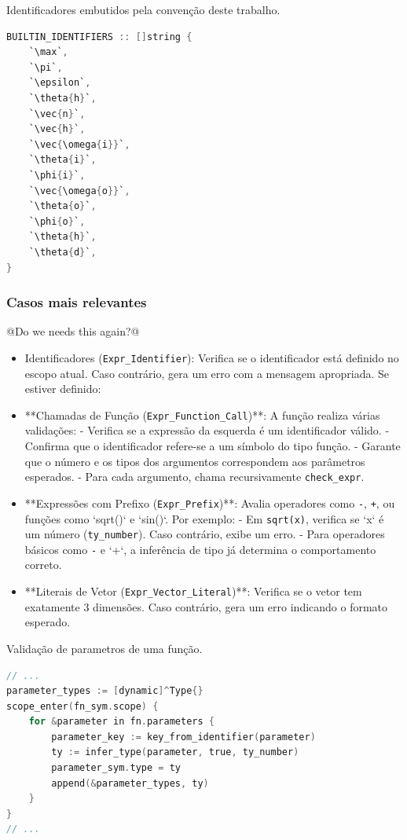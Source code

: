 \begin{codigo}[htb]
    \caption{\small Identificadores embutidos pela convenção deste trabalho. }
    \label{cod-builtins}
\begin{lstlisting}[language=C, numbers=none, frame=none, inputencoding=latin1]
BUILTIN_IDENTIFIERS :: []string {
    `\max`,
    `\pi`,
    `\epsilon`,
    `\theta{h}`,
    `\vec{n}`,
    `\vec{h}`,
    `\vec{\omega{i}}`,
    `\theta{i}`,
    `\phi{i}`,
    `\vec{\omega{o}}`,
    `\theta{o}`,
    `\phi{o}`,
    `\theta{h}`,
    `\theta{d}`,
}
\end{lstlisting}
\end{codigo}


\subsubsection{Casos mais relevantes}

@Do we needs this again?@
\begin{itemize}
    
    \item Identificadores (\verb`Expr_Identifier`):
      Verifica se o identificador está definido no escopo atual. Caso contrário, gera um erro com a mensagem apropriada. Se estiver definido:
    \item **Chamadas de Função (\verb`Expr_Function_Call`)**: 
      A função realiza várias validações:
      - Verifica se a expressão da esquerda é um identificador válido.
      - Confirma que o identificador refere-se a um símbolo do tipo função.
      - Garante que o número e os tipos dos argumentos correspondem aos parâmetros esperados.
      - Para cada argumento, chama recursivamente \verb`check_expr`.
    \item **Expressões com Prefixo (\verb`Expr_Prefix`)**:  
      Avalia operadores como \verb`-`, \verb`+`, ou funções como `sqrt()` e `sin()`. Por exemplo:
      - Em \verb`sqrt(x)`, verifica se `x` é um número (\verb`ty_number`). Caso contrário, exibe um erro.
      - Para operadores básicos como \verb`-` e `+`, a inferência de tipo já determina o comportamento correto.
    \item **Literais de Vetor (\verb`Expr_Vector_Literal`)**:  
      Verifica se o vetor tem exatamente 3 dimensões. Caso contrário, gera um erro indicando o formato esperado.
\end{itemize}





\begin{codigo}[htb]
    \caption{\small Validação de parametros de uma função. }
    \label{cod-parametros-validation}
\begin{lstlisting}[language=C, numbers=none, frame=none, inputencoding=latin1]
// ...
parameter_types := [dynamic]^Type{}
scope_enter(fn_sym.scope) {
    for &parameter in fn.parameters {
        parameter_key := key_from_identifier(parameter)
        ty := infer_type(parameter, true, ty_number)
        parameter_sym.type = ty
        append(&parameter_types, ty)
    }
}
// ...
\end{lstlisting}
\end{codigo}


